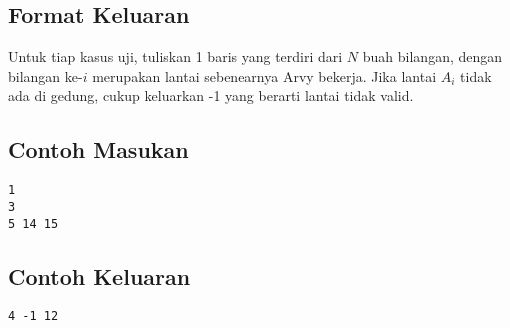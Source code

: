 \documentclass{article}
\begin{document}
\subsection*{Format Keluaran}

Untuk tiap kasus uji, tuliskan 1 baris yang terdiri dari $N$ buah bilangan, dengan bilangan ke-$i$ merupakan lantai sebenearnya Arvy bekerja. Jika lantai $A_i$ tidak ada di gedung, cukup keluarkan -1 yang berarti lantai tidak valid.
\\

\begin{multicols}{2}
\subsection*{Contoh Masukan}
\begin{lstlisting}
1
3
5 14 15
\end{lstlisting}
\columnbreak
\subsection*{Contoh Keluaran}
\begin{lstlisting}
4 -1 12
\end{lstlisting}
\vfill
\null
\end{multicols}

\pagebreak
\end{document}
